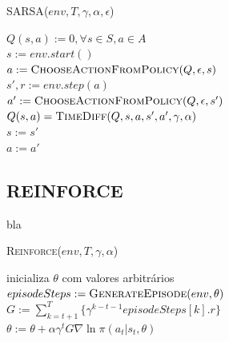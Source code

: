 \documentclass[letterpaper]{article}
\begin{document}
\linesnumbered
\dontprintsemicolon
\begin{algorithm}[t!]
{
	\caption{\textsc{SARSA}($ env, T, \gamma, \alpha, \epsilon $)}
	\label{alg:sarsa}
    $Q(s,a) := 0, \forall s \in S, a \in A $\\

    {
      $s := env.start()$\\
      $a := \textsc{ChooseActionFromPolicy}(Q, \epsilon, s) $\\

      {
        $s', r := env.step(a)$\\
        $a' := \textsc{ChooseActionFromPolicy}(Q, \epsilon, s') $\\
        $Q(s, a) = \textsc{TimeDiff}(Q, s, a, s', a', \gamma, \alpha)$\\
        $s := s'$ \\
        $a := a'$ \\
      }
    }

}
\end{algorithm}


\subsection{REINFORCE}

bla

\linesnumbered
\dontprintsemicolon
\begin{algorithm}[t!]
{
	\caption{\textsc{Reinforce}($ env, T, \gamma, \alpha $)}
	\label{alg:reinforce}
    inicializa $ \theta $ com valores arbitrários \\

    {
      $episodeSteps := \textsc{GenerateEpisode}(env, \theta)$\\

      {
        $G := \sum_{k = t+1}^T \{ \gamma^{k-t-1} episodeSteps[k].r \}$\\
        $ \theta := \theta + \alpha \gamma^t G \nabla \ln \pi(a_t|s_t, \theta) $
      }
    }
}
\end{algorithm}
\end{document}
